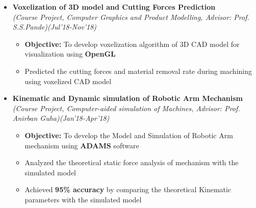 \documentclass[a4paper,10pt]{article}
\begin{document}
\begin{itemize}
\item \textbf{Voxelization of 3D model and Cutting Forces Prediction}\\
\emph{(Course Project, Computer Graphics and Product Modelling, Advisor: Prof. S.S.Pande)\hfill (Jul'18-Nov’18)} \\[-0.4cm]
	\begin{itemize}[noitemsep,nolistsep]
    \item \textbf{Objective:} To develop voxelization algorithm of 3D CAD model for visualization using \textbf{OpenGL}
    \item Predicted the cutting forces and material removal rate during machining using voxelized CAD model
	\end{itemize}
	
\item \textbf{Kinematic and Dynamic simulation of Robotic Arm Mechanism} \\
\emph{(Course Project, Computer-aided simulation of Machines, Advisor: Prof. Anirban Guha)\hfill (Jan’18-Apr'18)} \\[-0.4cm]
	\begin{itemize}[noitemsep,nolistsep]
    \item \textbf{Objective:} To develop the Model and Simulation of Robotic Arm mechanism using \textbf{ADAMS} software
    \item Analyzed the theoretical static force analysis of mechanism with the simulated model
    \item Achieved \textbf{95\% accuracy} by comparing the theoretical Kinematic parameters with the simulated model
	\end{itemize}


\end{itemize}
\end{document}
